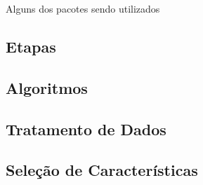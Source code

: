 			Alguns dos pacotes sendo utilizados 

		\subsection{Etapas}
		\subsection{Algoritmos}
		\subsection{Tratamento de Dados}
		\subsection{Seleção de Características}